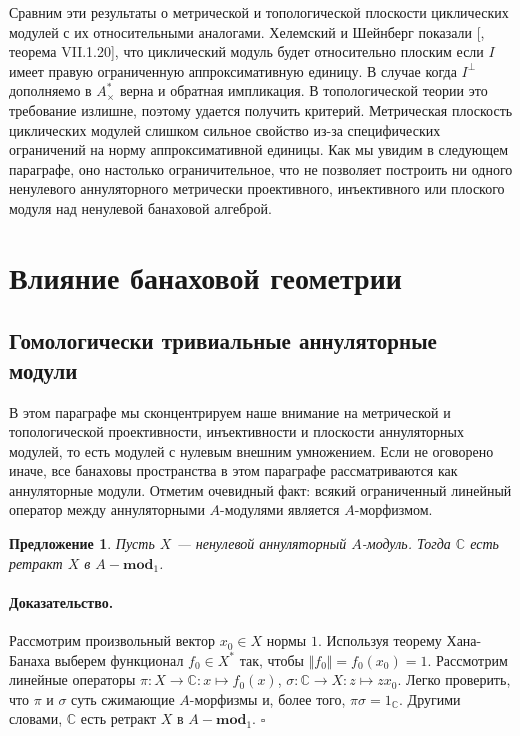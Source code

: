 \documentclass[12pt]{article}
\newtheorem{proposition}[theorem]{Предложение}
\renewenvironment{proof}{\paragraph{Доказательство.}}{\hfill$\square$\medskip}
\begin{document}
Сравним эти результаты о метрической и топологической плоскости циклических
модулей с их относительными аналогами. Хелемский и Шейнберг показали
[\cite{HelHomolBanTopAlg}, теорема VII.1.20], что циклический модуль будет
относительно плоским если $I$ имеет правую ограниченную аппроксимативную
единицу. В случае когда $I^\perp$ дополняемо в $A_\times^*$ верна и обратная
импликация. В топологической теории это требование излишне, поэтому удается
получить критерий. Метрическая плоскость циклических модулей слишком сильное
свойство из-за специфических ограничений на норму аппроксимативной единицы. Как
мы увидим в следующем параграфе, оно настолько ограничительное, что не позволяет
построить ни одного ненулевого аннуляторного метрически проективного,
инъективного или плоского модуля над ненулевой банаховой алгеброй.


\section{Влияние банаховой геометрии}\label{SectionTheImpactOfBanachGeometry}



\subsection{Гомологически тривиальные аннуляторные
    модули}\label{SubSectionHomoligicallyTrivialAnnihilatorModules}

В этом параграфе мы сконцентрируем наше внимание на метрической и топологической
проективности, инъективности и плоскости аннуляторных модулей, то есть модулей с
нулевым внешним умножением. Если не оговорено иначе, все банаховы пространства в
этом параграфе рассматриваются как аннуляторные модули. Отметим очевидный факт:
всякий ограниченный линейный оператор между аннуляторными $A$-модулями является
$A$-морфизмом.

\begin{proposition}\label{AnnihCModIsRetAnnihMod} Пусть $X$ --- ненулевой
    аннуляторный $A$-модуль. Тогда $\mathbb{C}$ есть ретракт $X$ в
    $A-\mathbf{mod}_1$.
\end{proposition}
\begin{proof} Рассмотрим произвольный вектор $x_0\in X$ нормы $1$. Используя
    теорему Хана-Банаха выберем функционал $f_0\in X^*$ так, чтобы $\Vert
        f_0\Vert=f_0(x_0)=1$. Рассмотрим линейные операторы $\pi:X\to
        \mathbb{C}:x\mapsto f_0(x)$, $\sigma:\mathbb{C}\to X:z\mapsto zx_0$. Легко
    проверить, что $\pi$ и $\sigma$ суть сжимающие $A$-морфизмы и, более того,
    $\pi\sigma=1_\mathbb{C}$. Другими словами, $\mathbb{C}$ есть ретракт $X$ в
    $A-\mathbf{mod}_1$.
\end{proof}
\end{document}
